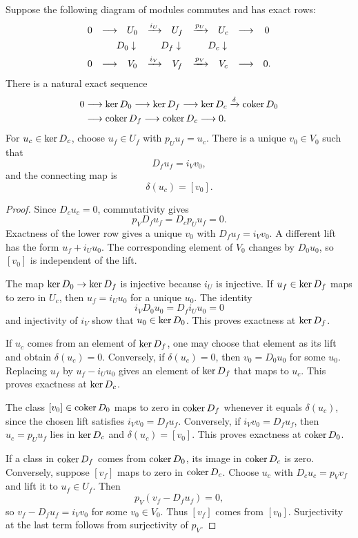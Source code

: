 \begin{theorem}\label{thm:relative_obstruction_sequence}
Suppose the following diagram of modules commutes and has exact rows:
\[
\begin{array}{ccccccccc}
0&\longrightarrow&U_0&\xrightarrow{i_U}&U_f&\xrightarrow{p_U}&U_c&\longrightarrow&0\\[4pt]
&&\mathllap{D_0}\downarrow&&\mathllap{D_f}\downarrow&&\mathllap{D_c}\downarrow&&\\[4pt]
0&\longrightarrow&V_0&\xrightarrow{i_V}&V_f&\xrightarrow{p_V}&V_c&\longrightarrow&0.
\end{array}
\]
There is a natural exact sequence
\[
\begin{aligned}
0&\longrightarrow\operatorname{ker} D_0
\longrightarrow\operatorname{ker} D_f
\longrightarrow\operatorname{ker} D_c
\xrightarrow{\delta}\operatorname{coker} D_0\\
&\longrightarrow\operatorname{coker} D_f
\longrightarrow\operatorname{coker} D_c
\longrightarrow0.
\end{aligned}
\]
For $u_c\in\operatorname{ker} D_c$, choose $u_f\in U_f$ with $p_Uu_f=u_c$.  There is a unique $v_0\in V_0$ such that
\[
D_fu_f=i_Vv_0,
\]
and the connecting map is
\[
\delta(u_c)=[v_0].
\]
\end{theorem}

\begin{proof}
Since $D_cu_c=0$, commutativity gives
\[
p_VD_fu_f=D_cp_Uu_f=0.
\]
Exactness of the lower row gives a unique $v_0$ with $D_fu_f=i_Vv_0$.  A different lift has the form $u_f+i_Uu_0$.  The corresponding element of $V_0$ changes by $D_0u_0$, so $[v_0]$ is independent of the lift.

The map $\operatorname{ker} D_0\to\operatorname{ker} D_f$ is injective because $i_U$ is injective.  If $u_f\in\operatorname{ker} D_f$ maps to zero in $U_c$, then $u_f=i_Uu_0$ for a unique $u_0$.  The identity
\[
i_VD_0u_0=D_fi_Uu_0=0
\]
and injectivity of $i_V$ show that $u_0\in\operatorname{ker} D_0$.  This proves exactness at $\operatorname{ker} D_f$.

If $u_c$ comes from an element of $\operatorname{ker} D_f$, one may choose that element as its lift and obtain $\delta(u_c)=0$.  Conversely, if $\delta(u_c)=0$, then $v_0=D_0u_0$ for some $u_0$.  Replacing $u_f$ by $u_f-i_Uu_0$ gives an element of $\operatorname{ker} D_f$ that maps to $u_c$.  This proves exactness at $\operatorname{ker} D_c$.

The class $[v_0]\in\operatorname{coker} D_0$ maps to zero in $\operatorname{coker} D_f$ whenever it equals $\delta(u_c)$, since the chosen lift satisfies $i_Vv_0=D_fu_f$.  Conversely, if $i_Vv_0=D_fu_f$, then $u_c=p_Uu_f$ lies in $\operatorname{ker} D_c$ and $\delta(u_c)=[v_0]$.  This proves exactness at $\operatorname{coker} D_0$.

If a class in $\operatorname{coker} D_f$ comes from $\operatorname{coker} D_0$, its image in $\operatorname{coker} D_c$ is zero.  Conversely, suppose $[v_f]$ maps to zero in $\operatorname{coker} D_c$.  Choose $u_c$ with $D_cu_c=p_Vv_f$ and lift it to $u_f\in U_f$.  Then
\[
p_V(v_f-D_fu_f)=0,
\]
so $v_f-D_fu_f=i_Vv_0$ for some $v_0\in V_0$.  Thus $[v_f]$ comes from $[v_0]$.  Surjectivity at the last term follows from surjectivity of $p_V$.
\end{proof}

